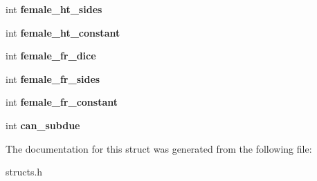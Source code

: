 \begin{DoxyCompactItemize}
\item 
\hypertarget{structmob__race__data_ac43aef59dbadbb72b5536877a9efc8e0}{int {\bfseries female\-\_\-ht\-\_\-sides}}\label{structmob__race__data_ac43aef59dbadbb72b5536877a9efc8e0}

\item 
\hypertarget{structmob__race__data_adc112416f42013440afcac7cb8910fe0}{int {\bfseries female\-\_\-ht\-\_\-constant}}\label{structmob__race__data_adc112416f42013440afcac7cb8910fe0}

\item 
\hypertarget{structmob__race__data_a5cd750f3726e8acabb36aad63071efcb}{int {\bfseries female\-\_\-fr\-\_\-dice}}\label{structmob__race__data_a5cd750f3726e8acabb36aad63071efcb}

\item 
\hypertarget{structmob__race__data_a703e31001163250eda29eeafe87c7e89}{int {\bfseries female\-\_\-fr\-\_\-sides}}\label{structmob__race__data_a703e31001163250eda29eeafe87c7e89}

\item 
\hypertarget{structmob__race__data_a2ceca6988142b9598a1170fa014af2eb}{int {\bfseries female\-\_\-fr\-\_\-constant}}\label{structmob__race__data_a2ceca6988142b9598a1170fa014af2eb}

\item 
\hypertarget{structmob__race__data_a5144d6842862b73c79a15994a3734429}{int {\bfseries can\-\_\-subdue}}\label{structmob__race__data_a5144d6842862b73c79a15994a3734429}

\end{DoxyCompactItemize}


The documentation for this struct was generated from the following file\-:\begin{DoxyCompactItemize}
\item 
structs.\-h\end{DoxyCompactItemize}

